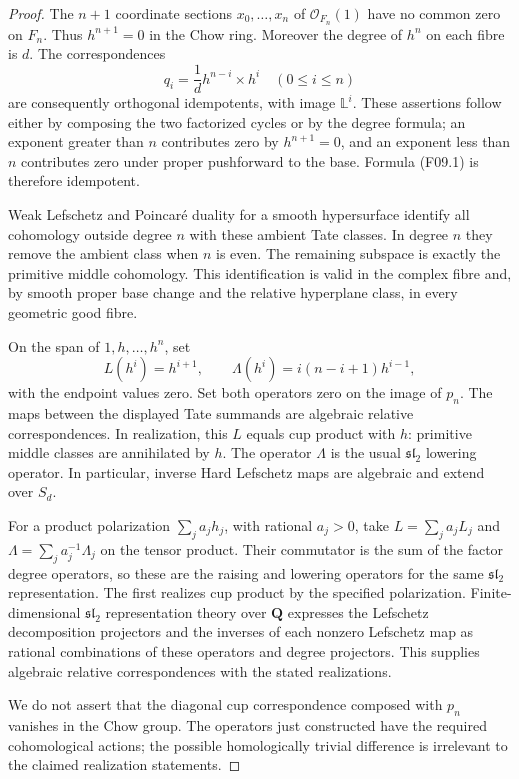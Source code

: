 \documentclass[11pt]{article}
\theoremstyle{remark}\newtheorem{remark}[theorem]{Remark}
\begin{document}
\begin{proof}
The $n+1$ coordinate sections $x_0,\ldots,x_n$ of
$\mathcal O_{F_n}(1)$ have no common zero on $F_n$. Thus
$h^{n+1}=0$ in the Chow ring. Moreover the degree of $h^n$ on
each fibre is $d$. The correspondences
\[
 q_i=\frac1d h^{n-i}\times h^i\quad(0\leq i\leq n)
\]
are consequently orthogonal idempotents, with image
$\mathbb L^i$. These assertions follow either by composing the
two factorized cycles or by the degree formula; an exponent
greater than $n$ contributes zero by $h^{n+1}=0$, and an exponent
less than $n$ contributes zero under proper pushforward to the
base. Formula (F09.1) is therefore idempotent.

Weak Lefschetz and Poincar\'e duality for a smooth hypersurface
identify all cohomology outside degree $n$ with these ambient
Tate classes. In degree $n$ they remove the ambient class when
$n$ is even. The remaining subspace is exactly the primitive
middle cohomology. This identification is valid in the complex
fibre and, by smooth proper base change and the relative
hyperplane class, in every geometric good fibre.

On the span of $1,h,\ldots,h^n$, set
\[
 L(h^i)=h^{i+1},\qquad
 \Lambda(h^i)=i(n-i+1)h^{i-1},
 \tag{F09.2}
\]
with the endpoint values zero. Set both operators zero on the
image of $p_n$. The maps between the displayed Tate summands
are algebraic relative correspondences. In realization, this
$L$ equals cup product with $h$: primitive middle classes are
annihilated by $h$. The operator $\Lambda$ is the usual
$\mathfrak{sl}_2$ lowering operator. In particular, inverse
Hard Lefschetz maps are algebraic and extend over $S_d$.

For a product polarization $\sum_j a_jh_j$, with rational
$a_j>0$, take $L=\sum_j a_jL_j$ and
$\Lambda=\sum_j a_j^{-1}\Lambda_j$ on the tensor product.
Their commutator is the sum of the factor degree operators,
so these are the raising and lowering operators for the same
$\mathfrak{sl}_2$ representation. The first realizes cup
product by the specified polarization.
Finite-dimensional $\mathfrak{sl}_2$ representation theory over
$\mathbf Q$ expresses the Lefschetz decomposition projectors
and the inverses of each nonzero Lefschetz map as rational
combinations of these operators and degree projectors. This
supplies algebraic relative correspondences with the stated
realizations.

We do not assert that the diagonal cup correspondence composed
with $p_n$ vanishes in the Chow group. The operators just
constructed have the required cohomological actions; the
possible homologically trivial difference is irrelevant to
the claimed realization statements.
\end{proof}
\end{document}

